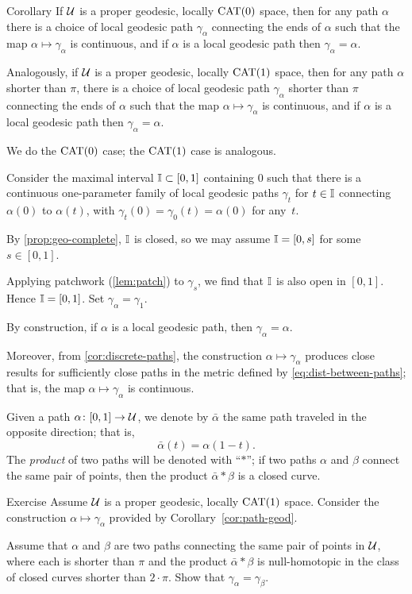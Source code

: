 \begin{thm}{Corollary}\label{cor:path-geod}
If $\mathcal{U}$ is a proper geodesic, locally $\mathrm{CAT}(0)$ space, then 
for any path $\alpha$ there is a choice of   local geodesic path $\gamma_\alpha$  connecting the ends of $\alpha$ such that the map $\alpha\mapsto\gamma_\alpha$ is continuous, and if $\alpha$ is a local geodesic path then $\gamma_\alpha=\alpha$. 

Analogously, if $\mathcal{U}$ is a proper geodesic, locally $\mathrm{CAT}(1)$ space, then 
for any path $\alpha$ shorter than $\pi$,  
there is a choice of  local geodesic path $\gamma_\alpha$ shorter than $\pi$ connecting the ends of $\alpha$ such that the map $\alpha\mapsto\gamma_\alpha$ is continuous, and if $\alpha$ is a local geodesic path then $\gamma_\alpha=\alpha$.
\end{thm}

We do the $\mathrm{CAT}(0)$ case;
the $\mathrm{CAT}(1)$ case is analogous.

Consider the maximal interval $\mathbb{I}\subset[0,1]$ containing $0$
such that there is a continuous one-parameter family of 
local geodesic paths $\gamma_t$ for $t\in \mathbb{I}$ connecting $\alpha(0)$ to $\alpha(t)$, with $\gamma_t(0)=\gamma_0(t)=\alpha(0)$ for any~$t$. 

By \ref{prop:geo-complete}, $\mathbb{I}$ is closed,
so we may assume $\mathbb{I}=[0,s]$ for some $s\in [0,1]$.

Applying  patchwork (\ref{lem:patch}) to  $\gamma_{s}$, 
we find that $\mathbb{I}$ is also open in $[0,1]$. 
Hence $\mathbb{I}=[0,1]$.
Set $\gamma_\alpha=\gamma_1$.

By construction,  if $\alpha$ is a local geodesic path, then $\gamma_\alpha=\alpha$. 

Moreover, from \ref{cor:discrete-paths},
the construction $\alpha\mapsto \gamma_\alpha$ produces close results for sufficiently close paths in the metric defined by \ref{eq:dist-between-paths};
that is, the map  $\alpha\mapsto \gamma_\alpha$ is continuous.
\qeds

Given a path $\alpha\colon[0,1]\to\mathcal{U}$,
we denote by $\bar\alpha$ the same path traveled in the opposite direction;
that is,
\[\bar\alpha(t)=\alpha(1-t).\]
The \emph{product} of two paths  will be denoted with ``$*$'';
if two paths $\alpha$ and $\beta$ connect the same pair of points, then the product $\bar\alpha*\beta$ is a closed curve.

\begin{thm}{Exercise}\label{ex:null-homotopic}
Assume $\mathcal{U}$ is a proper geodesic, locally $\mathrm{CAT}(1)$ space. 
Consider the construction $\alpha\mapsto\gamma_\alpha$ provided by Corollary~\ref{cor:path-geod}.

Assume that $\alpha$ and $\beta$ are two paths connecting the same pair of points in $\mathcal{U}$, where 
each is shorter than $\pi$ 
and the product  
$\bar\alpha*\beta$ is null-homotopic in the class of closed curves shorter than $2\cdot\pi$.
Show that $\gamma_\alpha=\gamma_\beta$.
\end{thm}

